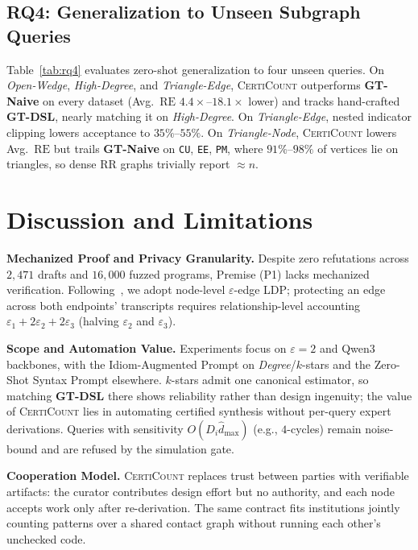 \documentclass[conference]{IEEEtran}
\newlength{\ieeeindent}
\newcommand{\parhead}[1]{\par\noindent\hspace*{\ieeeindent}\textbf{#1}}
\theoremstyle{ieeeitalic}
\newcommand{\dhatmax}{\hat{d}_{\max}}
\newcommand{\RE}{\mathrm{RE}}
\begin{document}
\subsection{RQ4: Generalization to Unseen Subgraph Queries}
\label{sec:rq4}

Table~\ref{tab:rq4} evaluates zero-shot generalization to four unseen queries. On \emph{Open-Wedge}, \emph{High-Degree}, and \emph{Triangle-Edge}, \textsc{CertiCount} outperforms \textbf{GT-Naive} on every dataset (Avg.\ $\RE$ $4.4\times$--$18.1\times$ lower) and tracks hand-crafted \textbf{GT-DSL}, nearly matching it on \emph{High-Degree}. On \emph{Triangle-Edge}, nested indicator clipping lowers acceptance to $35\%$--$55\%$. On \emph{Triangle-Node}, \textsc{CertiCount} lowers Avg.\ $\RE$ but trails \textbf{GT-Naive} on \texttt{CU}, \texttt{EE}, \texttt{PM}, where $91\%$--$98\%$ of vertices lie on triangles, so dense RR graphs trivially report $\approx n$.

\section{Discussion and Limitations}
\label{sec:discussion}

\parhead{Mechanized Proof and Privacy Granularity.}
Despite zero refutations across $2{,}471$ drafts and $16{,}000$ fuzzed programs, Premise (P1) lacks mechanized verification. Following~\cite{imola2021locally,zhang2026psc}, we adopt node-level $\varepsilon$-edge LDP; protecting an edge across both endpoints' transcripts requires relationship-level accounting $\varepsilon_1 + 2\varepsilon_2 + 2\varepsilon_3$ (halving $\varepsilon_2$ and $\varepsilon_3$).

\parhead{Scope and Automation Value.}
Experiments focus on $\varepsilon=2$ and Qwen3 backbones, with the Idiom-Augmented Prompt on \emph{Degree}/$k$-stars and the Zero-Shot Syntax Prompt elsewhere. $k$-stars admit one canonical estimator, so matching \textbf{GT-DSL} there shows reliability rather than design ingenuity; the value of \textsc{CertiCount} lies in automating certified synthesis without per-query expert derivations. Queries with sensitivity $O(D_i \dhatmax)$ (e.g., $4$-cycles) remain noise-bound and are refused by the simulation gate.

\parhead{Cooperation Model.}
\textsc{CertiCount} replaces trust between parties with verifiable artifacts: the curator contributes design effort but no authority, and each node accepts work only after re-derivation. The same contract fits institutions jointly counting patterns over a shared contact graph without running each other's unchecked code.
\end{document}
